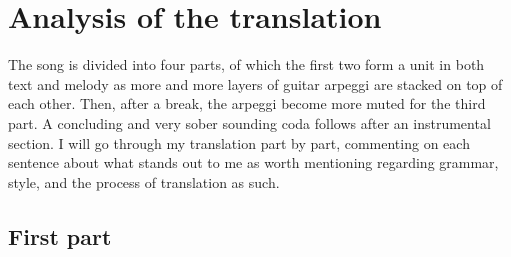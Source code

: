 \documentclass[12pt,paper=a4]{scrartcl}
\begin{document}
\begin{quote}


\end{quote}

\section{Analysis of the translation}

The song is divided into four parts, of which the first two form a unit in both
text and melody as more and more layers of guitar arpeggi are stacked on top of
each other. Then, after a break, the arpeggi become more muted for the third
part. A concluding and very sober sounding coda follows after an instrumental
section. I will go through my translation part by part, commenting on each
sentence about what stands out to me as worth mentioning regarding grammar,
style, and the process of translation as such.

\subsection{First part}
\end{document}
